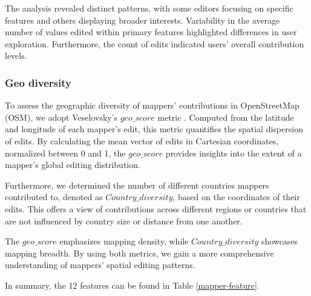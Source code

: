 \documentclass[manuscript,screen,review]{acmart}
\begin{document}
The analysis revealed distinct patterns, with some editors focusing on specific features and others displaying broader interests. Variability in the average number of values edited within primary features highlighted differences in user exploration. Furthermore, the count of edits indicated users' overall contribution levels. 

\subsubsection{Geo diversity}

To assess the geographic diversity of mappers' contributions in OpenStreetMap (OSM), we adopt Veselovsky's $geo\_score$ metric \cite{Veselovsky22}. Computed from the latitude and longitude of each mapper's edit, this metric quantifies the spatial dispersion of edits. By calculating the mean vector of edits in Cartesian coordinates, normalized between 0 and 1, the $geo\_score$ provides insights into the extent of a mapper's global editing distribution.

Furthermore, we determined the number of different countries mappers contributed to, denoted as $Country\_diversity$, based on the coordinates of their edits. This offers a view of contributions across different regions or countries that are not influenced by country size or distance from one another.

The $geo\_score$ emphasizes mapping density, while $Country\_diversity$ showcases mapping breadth. By using both metrics, we gain a more comprehensive understanding of mappers' spatial editing patterns.

In summary, the 12 features can be found in Table \ref{mapper-feature}.
\end{document}
